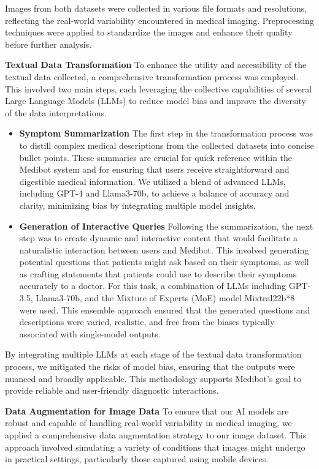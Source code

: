 Images from both datasets were collected in various file formats and resolutions, reflecting the real-world variability encountered in medical imaging. Preprocessing techniques were applied to standardize the images and enhance their quality before further analysis.

\textbf{Textual Data Transformation}
To enhance the utility and accessibility of the textual data collected, a comprehensive transformation process was employed. This involved two main steps, each leveraging the collective capabilities of several Large Language Models (LLMs) to reduce model bias and improve the diversity of the data interpretations.

\begin{itemize}
    \item \textbf{Symptom Summarization}
    The first step in the transformation process was to distill complex medical descriptions from the collected datasets into concise bullet points. These summaries are crucial for quick reference within the Medibot system and for ensuring that users receive straightforward and digestible medical information. We utilized a blend of advanced LLMs, including GPT-4 and Llama3-70b, to achieve a balance of accuracy and clarity, minimizing bias by integrating multiple model insights.
    
    
    \item \textbf{Generation of Interactive Queries}
    Following the summarization, the next step was to create dynamic and interactive content that would facilitate a naturalistic interaction between users and Medibot. This involved generating potential questions that patients might ask based on their symptoms, as well as crafting statements that patients could use to describe their symptoms accurately to a doctor. For this task, a combination of LLMs including GPT-3.5, Llama3-70b, and the Mixture of Experts (MoE) model Mixtral22b*8 were used. This ensemble approach ensured that the generated questions and descriptions were varied, realistic, and free from the biases typically associated with single-model outputs.
    
\end{itemize}
By integrating multiple LLMs at each stage of the textual data transformation process, we mitigated the risks of model bias, ensuring that the outputs were nuanced and broadly applicable. This methodology supports Medibot's goal to provide reliable and user-friendly diagnostic interactions.

\textbf{Data Augmentation for Image Data}
To ensure that our AI models are robust and capable of handling real-world variability in medical imaging, we applied a comprehensive data augmentation strategy to our image dataset. This approach involved simulating a variety of conditions that images might undergo in practical settings, particularly those captured using mobile devices.

